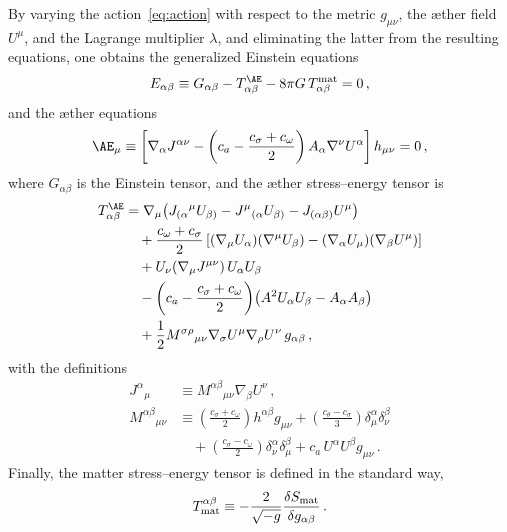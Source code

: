 \documentclass[
    floats,
    floatfix,
    amssymb,
    prd,
    twocolumn,
    superscriptaddress,
    nofootinbib,
    unicode,
    colorlinks=true,
    linktocpage=true
]{revtex4-2}
\begin{document}
By varying the action~\eqref{eq:action} with respect to the metric
$g_{\mu\nu}$, the \ae ther field $U^\mu$, and the Lagrange multiplier
$\lambda$, and eliminating the latter from the resulting equations,
one obtains the generalized Einstein equations
\begin{equation}\label{eq:Eeq}
E_{\alpha\beta} \equiv G_{\alpha\beta} - T^{\AE}_{\alpha\beta}
- 8\pi G\, T^{\rm mat}_{\alpha\beta} = 0\,,
\end{equation}
and the \ae ther equations
\begin{equation}\label{eq:AEeq}
\AE_\mu \equiv \left[
\nabla_\alpha J^{\alpha\nu}
- \left(c_a - \frac{c_\sigma + c_\omega}{2}\right)
A_\alpha \nabla^\nu U^\alpha
\right] h_{\mu\nu} = 0\,,
\end{equation}
where $G_{\alpha\beta}$ is the Einstein tensor, and the \ae ther
stress--energy tensor is
\begin{align}\label{eq:Tae}
T^{\AE}_{\alpha\beta} &=
\nabla_\mu\!\left(
J_{(\alpha}{}^\mu U_{\beta)}
- J^\mu{}_{(\alpha} U_{\beta)}
- J_{(\alpha\beta)} U^\mu
\right) \nonumber \\
&\quad + \frac{c_\omega + c_\sigma}{2}
\left[
(\nabla_\mu U_\alpha)(\nabla^\mu U_\beta)
- (\nabla_\alpha U_\mu)(\nabla_\beta U^\mu)
\right] \nonumber \\
&\quad + U_\nu(\nabla_\mu J^{\mu\nu})\, U_\alpha U_\beta\nonumber\\ &\quad 
- \left(c_a - \frac{c_\sigma + c_\omega}{2}\right)
\!\left(A^2 U_\alpha U_\beta - A_\alpha A_\beta\right) \nonumber \\
&\quad + \frac{1}{2}
M^{\sigma\rho}{}_{\mu\nu}
\nabla_\sigma U^\mu \nabla_\rho U^\nu\, g_{\alpha\beta}\,,
\end{align}
with the definitions
\begin{align}
J^\alpha{}_\mu &\equiv M^{\alpha\beta}{}_{\mu\nu}\nabla_\beta U^\nu\,, \\
M^{\alpha\beta}{}_{\mu\nu} &\equiv
\left(\frac{c_\sigma + c_\omega}{2}\right) h^{\alpha\beta} g_{\mu\nu}
+ \left(\frac{c_\theta - c_\sigma}{3}\right) \delta^\alpha_\mu \delta^\beta_\nu
\nonumber\\
&\quad
+ \left(\frac{c_\sigma - c_\omega}{2}\right) \delta^\alpha_\nu \delta^\beta_\mu
+ c_a\, U^\alpha U^\beta g_{\mu\nu}\,.
\end{align}
Finally, the matter stress--energy tensor is defined in the standard way,
\begin{equation}\label{eq:Tmat}
T^{\alpha\beta}_{\rm mat} \equiv
-\frac{2}{\sqrt{-g}}\frac{\delta S_{\rm mat}}{\delta g_{\alpha\beta}}\,.
\end{equation}
\end{document}
